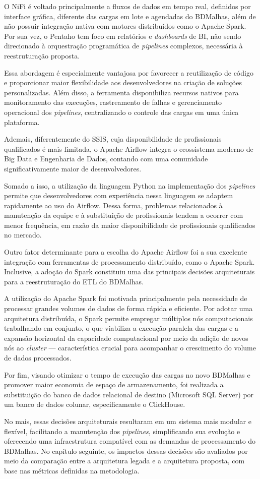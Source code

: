 O NiFi é voltado principalmente a fluxos de dados em tempo real, definidos por interface gráfica, 
diferente das cargas em lote e agendadas do BDMalhas, além de não possuir integração nativa com motores 
distribuídos como o Apache Spark. Por sua vez, o Pentaho tem foco em relatórios e \textit{dashboards} 
de BI, não sendo direcionado à orquestração programática de 
\textit{pipelines} complexos, necessária à reestruturação proposta.

Essa abordagem é especialmente vantajosa por favorecer a reutilização de código e proporcionar maior flexibilidade 
aos desenvolvedores na criação de soluções personalizadas. Além disso, a ferramenta disponibiliza 
recursos nativos para monitoramento das execuções, rastreamento de falhas e gerenciamento operacional dos 
\textit{pipelines}, centralizando o controle das cargas em uma única plataforma.

Ademais, diferentemente do SSIS, cuja disponibilidade de profissionais qualificados é mais limitada, o 
Apache Airflow integra o ecossistema moderno de Big Data e Engenharia de Dados, contando com uma comunidade 
significativamente maior de desenvolvedores. 

Somado a isso, a utilização da linguagem Python na implementação dos \textit{pipelines} permite que desenvolvedores 
com experiência nessa linguagem se adaptem rapidamente ao uso do Airflow. Dessa forma, problemas 
relacionados à manutenção da equipe e à substituição de profissionais tendem a ocorrer com menor frequência, 
em razão da maior disponibilidade de profissionais qualificados no mercado.

Outro fator determinante para a escolha do Apache Airflow foi a sua excelente integração com ferramentas 
de processamento distribuído, como o Apache Spark. Inclusive, a adoção do Spark constituiu uma das principais 
decisões arquiteturais para a reestruturação do ETL do BDMalhas.

A utilização do Apache Spark foi motivada principalmente pela necessidade de processar grandes volumes de 
dados de forma rápida e eficiente. Por adotar uma arquitetura distribuída, o Spark permite empregar 
múltiplos nós computacionais trabalhando em conjunto, o que viabiliza a execução paralela das cargas e a 
expansão horizontal da capacidade computacional por meio da adição de novos nós ao \textit{cluster} --- característica 
crucial para acompanhar o crescimento do volume de dados processados.

Por fim, visando otimizar o tempo de execução das cargas no novo BDMalhas e promover maior economia de 
espaço de armazenamento, foi realizada a substituição do banco de dados relacional de destino 
(Microsoft SQL Server) por um banco de dados colunar, especificamente o ClickHouse.

No mais, essas decisões arquiteturais resultaram em um sistema mais modular e flexível, facilitando a 
manutenção dos \textit{pipelines}, simplificando sua evolução e oferecendo uma infraestrutura compatível com as demandas 
de processamento do BDMalhas. No capítulo seguinte, os impactos dessas decisões são avaliados por meio da 
comparação entre a arquitetura legada e a arquitetura proposta, com base nas métricas definidas na metodologia.
